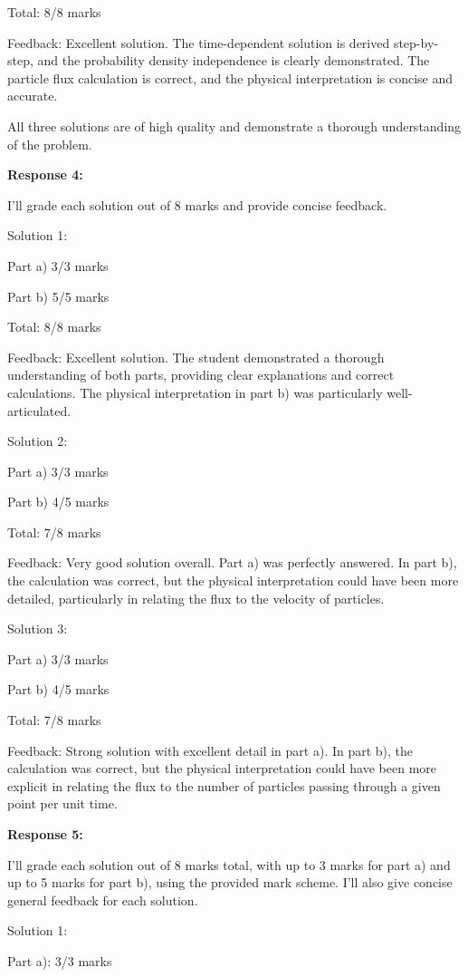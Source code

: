 \documentclass[a4paper,11pt]{article}
\begin{document}
Total: 8/8 marks

Feedback: Excellent solution. The time-dependent solution is derived step-by-step, and the probability density independence is clearly demonstrated. The particle flux calculation is correct, and the physical interpretation is concise and accurate.

All three solutions are of high quality and demonstrate a thorough understanding of the problem.

\bigskip
\textbf{Response 4:}

I'll grade each solution out of 8 marks and provide concise feedback.

Solution 1:

Part a) 3/3 marks

Part b) 5/5 marks

Total: 8/8 marks

Feedback: Excellent solution. The student demonstrated a thorough understanding of both parts, providing clear explanations and correct calculations. The physical interpretation in part b) was particularly well-articulated.

Solution 2:

Part a) 3/3 marks

Part b) 4/5 marks

Total: 7/8 marks

Feedback: Very good solution overall. Part a) was perfectly answered. In part b), the calculation was correct, but the physical interpretation could have been more detailed, particularly in relating the flux to the velocity of particles.

Solution 3:

Part a) 3/3 marks

Part b) 4/5 marks

Total: 7/8 marks

Feedback: Strong solution with excellent detail in part a). In part b), the calculation was correct, but the physical interpretation could have been more explicit in relating the flux to the number of particles passing through a given point per unit time.

\bigskip
\textbf{Response 5:}

I'll grade each solution out of 8 marks total, with up to 3 marks for part a) and up to 5 marks for part b), using the provided mark scheme. I'll also give concise general feedback for each solution.

Solution 1:

Part a): 3/3 marks
\end{document}
